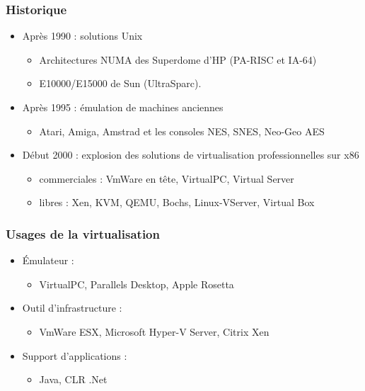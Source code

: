 \begin{frame}
\frametitle{Historique}
\begin{itemize}
\item <1>Après 1990 : solutions Unix
\begin{itemize}
\item Architectures NUMA des Superdome d'HP (PA-RISC et IA-64)
\item E10000/E15000 de Sun (UltraSparc).
\end{itemize}

\item <2>Après 1995 : émulation de machines anciennes
\begin{itemize}
\item Atari, Amiga, Amstrad et les consoles NES, SNES, Neo-Geo AES
\end{itemize}

\item <3>Début 2000 : explosion des solutions de virtualisation professionnelles sur x86
\begin{itemize}
\item commerciales : VmWare en tête, VirtualPC, Virtual Server 
\item libres : Xen, KVM, QEMU, Bochs, Linux-VServer, Virtual Box
\end{itemize}
\end{itemize}

\end{frame}


\begin{frame}
\frametitle{Usages de la virtualisation}
\begin{itemize}

\item <1>Émulateur :
\begin{itemize}
\item VirtualPC, Parallels Desktop, Apple Rosetta
\end{itemize}

\item <2>Outil d'infrastructure :
\begin{itemize}
\item VmWare ESX, Microsoft Hyper-V Server, Citrix Xen
\end{itemize}

\item <3>Support d'applications :
\begin{itemize}
\item Java, CLR .Net
\end{itemize}

\end{itemize}
\end{frame}


